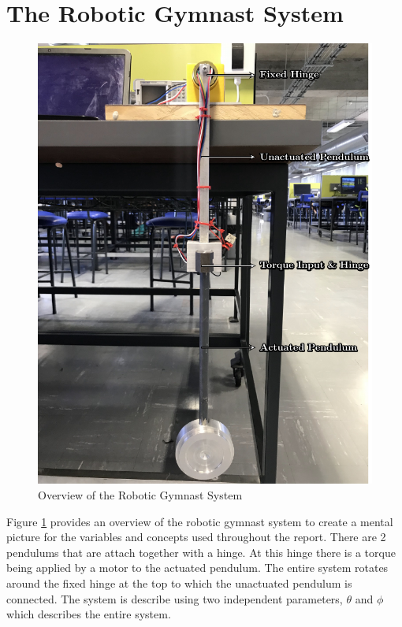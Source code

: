\section{The Robotic Gymnast System}
\begin{figure}[h]
	\centering
	\includegraphics{./figs/overview/overview.pdf}
	\caption{Overview of the Robotic Gymnast System}
	\label{fig:overview}
\end{figure}

Figure \ref{fig:overview} provides an overview of the robotic gymnast system to create a mental picture for the variables and concepts used throughout the report. There are 2 pendulums that are attach together with a hinge. At this hinge there is a torque being applied by a motor to the actuated pendulum. The entire system rotates around the fixed hinge at the top to which the unactuated pendulum is connected. The system is describe using two independent parameters, $\theta$ and $\phi$ which describes the entire system.\\

